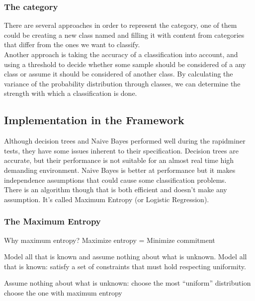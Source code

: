 \subsubsection{The  category}
There are several approaches in order to represent the  category, one of them could be creating a new class named  and filling it with content from categories that 
differ from the ones we want to classify.\\
Another approach is taking the accuracy of a classification into account, and using a threshold to decide whether some sample should be considered of a any class or assume it should be considered of another class. By calculating the variance of the probability distribution through classes, we can determine
the strength with which a classification is done.   



\subsection{Implementation in the Framework}
Although decision trees and Naive Bayes performed well during the rapidminer tests, they have some issues inherent to their specification. Decision trees are accurate, but their performance is 
not suitable for an almost real time high demanding environment. Naive Bayes is better at performance but it makes independence assumptions that could cause some classification problems.\\
There is an algorithm though that is both efficient and doesn't make any assumption. It's called Maximum Entropy (or Logistic Regression).

\subsubsection{The Maximum Entropy}
Why maximum entropy?
Maximize entropy = Minimize commitment

Model all that is known and assume nothing about what is unknown. 
Model all that is known: satisfy a set of constraints that must hold respecting uniformity.

Assume nothing about what is unknown: 
   choose the most “uniform” distribution 
   choose the one with maximum entropy

